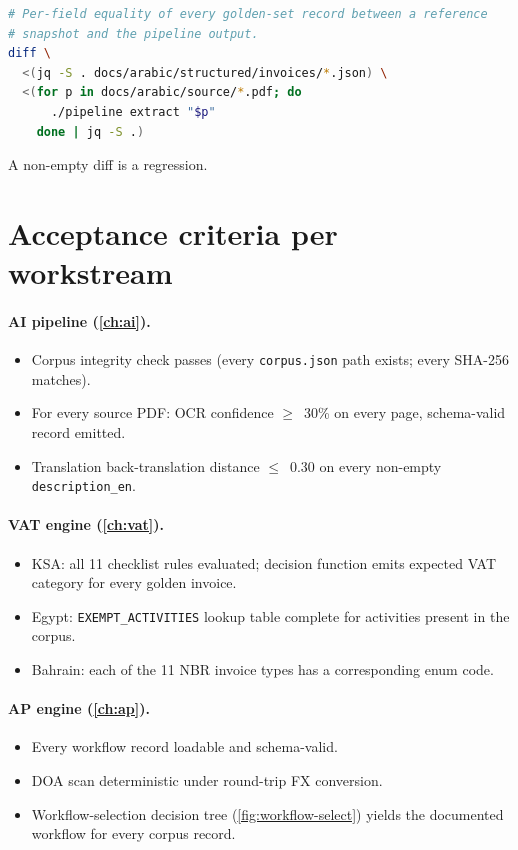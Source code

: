 \documentclass[11pt,a4paper,twoside]{report}
\begin{document}
\begin{lstlisting}[language=bash,basicstyle=\ttfamily\small]
# Per-field equality of every golden-set record between a reference
# snapshot and the pipeline output.
diff \
  <(jq -S . docs/arabic/structured/invoices/*.json) \
  <(for p in docs/arabic/source/*.pdf; do
      ./pipeline extract "$p"
    done | jq -S .)
\end{lstlisting}

A non-empty diff is a regression.

\section{Acceptance criteria per workstream}

\paragraph{AI pipeline (\cref{ch:ai}).}
\begin{itemize}
  \item Corpus integrity check passes (every \texttt{corpus.json} path
        exists; every SHA-256 matches).
  \item For every source PDF: OCR confidence $\geq$~30\% on every page,
        schema-valid record emitted.
  \item Translation back-translation distance $\leq$~0.30 on every
        non-empty \texttt{description\_en}.
\end{itemize}

\paragraph{VAT engine (\cref{ch:vat}).}
\begin{itemize}
  \item KSA: all 11 checklist rules evaluated; decision function
        emits expected VAT category for every golden invoice.
  \item Egypt: \texttt{EXEMPT\_ACTIVITIES} lookup table complete for
        activities present in the corpus.
  \item Bahrain: each of the 11 NBR invoice types has a corresponding
        enum code.
\end{itemize}

\paragraph{AP engine (\cref{ch:ap}).}
\begin{itemize}
  \item Every workflow record loadable and schema-valid.
  \item DOA scan deterministic under round-trip FX conversion.
  \item Workflow-selection decision tree (\cref{fig:workflow-select})
        yields the documented workflow for every corpus record.
\end{itemize}
\end{document}
